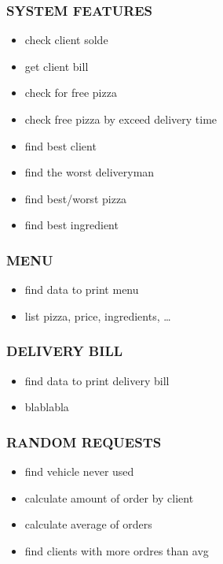 \documentclass[]{article}
\providecommand{\tightlist}{%
    \setlength{\itemsep}{0pt}\setlength{\parskip}{0pt}}
\begin{document}
\subsubsection{SYSTEM FEATURES}\label{system-features}

\begin{itemize}
        \tightlist
    \item
        check client solde
    \item
        get client bill
    \item
        check for free pizza
    \item
        check free pizza by exceed delivery time
    \item
        find best client
    \item
        find the worst deliveryman
    \item
        find best/worst pizza
    \item
        find best ingredient
\end{itemize}

\subsubsection{MENU}\label{menu}

\begin{itemize}
        \tightlist
    \item
        find data to print menu
    \item
        list pizza, price, ingredients, \ldots{}
\end{itemize}

\subsubsection{DELIVERY BILL}\label{delivery-bill}

\begin{itemize}
        \tightlist
    \item
        find data to print delivery bill
    \item
        blablabla
\end{itemize}

\subsubsection{RANDOM REQUESTS}\label{random-requests}

\begin{itemize}
        \tightlist
    \item
        find vehicle never used
    \item
        calculate amount of order by client
    \item
        calculate average of orders
    \item
        find clients with more ordres than avg
\end{itemize}
\end{document}
